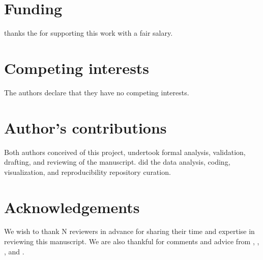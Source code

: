 \documentclass{bmcart}
\begin{document}
\begin{backmatter}

\section*{Funding}
   thanks the  for supporting this work with a fair salary. 
  
\section*{Competing interests}
  The authors declare that they have no competing interests.

\section*{Author's contributions}
  Both authors conceived of this project, undertook formal analysis, validation, drafting, and reviewing of the manuscript.  did the data analysis, coding, visualization, and reproducibility repository curation.

\section*{Acknowledgements}
  We wish to thank N reviewers in advance for sharing their time and expertise in reviewing this manuscript. We are also thankful for comments and advice from , , , and .



\end{backmatter}
\end{document}
